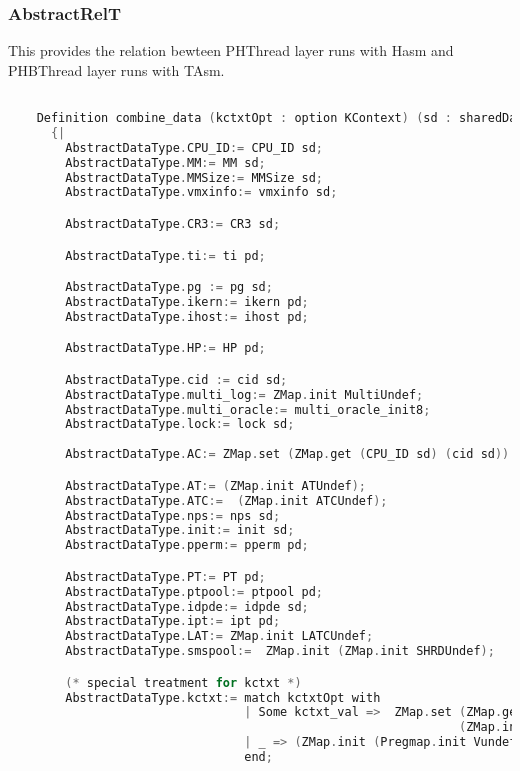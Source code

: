 
\subsubsection{AbstractRelT}

This provides the relation bewteen PHThread layer runs with Hasm and PHBThread layer runs with TAsm. 

\begin{lstlisting}[language=C]

    Definition combine_data (kctxtOpt : option KContext) (sd : sharedData) (pd: privData) : AbstractDataType.RData :=
      {|
        AbstractDataType.CPU_ID:= CPU_ID sd;
        AbstractDataType.MM:= MM sd;
        AbstractDataType.MMSize:= MMSize sd;
        AbstractDataType.vmxinfo:= vmxinfo sd;

        AbstractDataType.CR3:= CR3 sd;

        AbstractDataType.ti:= ti pd;

        AbstractDataType.pg := pg sd;
        AbstractDataType.ikern:= ikern pd;
        AbstractDataType.ihost:= ihost pd;

        AbstractDataType.HP:= HP pd;

        AbstractDataType.cid := cid sd;
        AbstractDataType.multi_log:= ZMap.init MultiUndef;
        AbstractDataType.multi_oracle:= multi_oracle_init8;
        AbstractDataType.lock:= lock sd;
        
        AbstractDataType.AC:= ZMap.set (ZMap.get (CPU_ID sd) (cid sd)) (AC pd) (ZMap.init Container_unused); 

        AbstractDataType.AT:= (ZMap.init ATUndef);
        AbstractDataType.ATC:=  (ZMap.init ATCUndef);
        AbstractDataType.nps:= nps sd;
        AbstractDataType.init:= init sd;
        AbstractDataType.pperm:= pperm pd;

        AbstractDataType.PT:= PT pd;
        AbstractDataType.ptpool:= ptpool pd;
        AbstractDataType.idpde:= idpde sd;
        AbstractDataType.ipt:= ipt pd;
        AbstractDataType.LAT:= ZMap.init LATCUndef;
        AbstractDataType.smspool:=  ZMap.init (ZMap.init SHRDUndef);

        (* special treatment for kctxt *)
        AbstractDataType.kctxt:= match kctxtOpt with 
                                 | Some kctxt_val =>  ZMap.set (ZMap.get (CPU_ID sd) (cid sd)) kctxt_val 
                                                               (ZMap.init (Pregmap.init Vundef))
                                 | _ => (ZMap.init (Pregmap.init Vundef))
                                 end;
        

\end{lstlisting}
